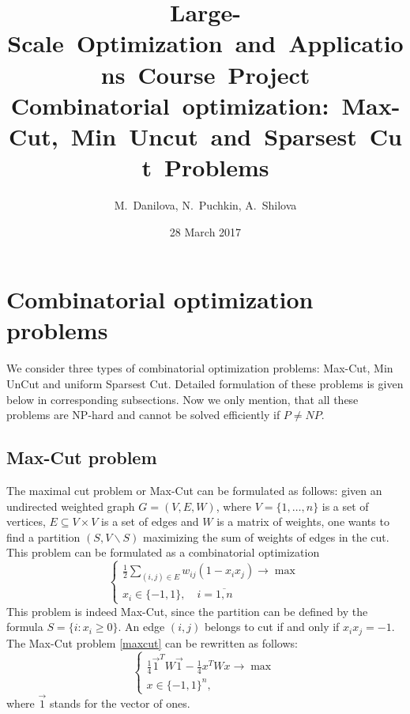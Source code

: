 \documentclass[12pt]{article}
\title{Large-Scale~Optimization~and~Applications~Course~Project\\
Combinatorial~optimization:~Max-Cut,~Min~Uncut~and~Sparsest~Cut~Problems}
\author{M.~Danilova, N.~Puchkin, A.~Shilova}
\date{28 March 2017}
\begin{document}
\maketitle

\section{Combinatorial optimization problems}

We consider three types of combinatorial optimization problems: Max-Cut, Min UnCut 
and uniform Sparsest Cut.
Detailed formulation of these problems is given below in corresponding subsections.
Now we only mention, that all these problems are NP-hard and cannot be solved 
efficiently if $P \neq NP$.



\subsection{Max-Cut problem}

The maximal cut problem or Max-Cut can be formulated as follows: given an undirected 
weighted graph $G = (V, E, W)$, where $V = \{1, \dots, n\}$ is a set of vertices, $E 
\subseteq V \times V$ is a set of edges and $W$ is a matrix of weights, one wants to find 
a partition $(S, V\backslash S)$ maximizing the sum of weights of edges in the cut.
This problem can be formulated as a combinatorial optimization
\begin{equation}
\label{maxcut}
	\begin{cases}
		\frac12 \sum\limits_{(i, j) \in E} w_{ij} ( 1 - x_i x_j ) \longrightarrow \max \\
		x_i \in \{ -1, 1 \}, \quad i = \overline{1, n}
	\end{cases}
\end{equation}
This problem is indeed Max-Cut, since the partition can be defined by the formula $S = 
\{ i : x_i \geq 0 \}$.
An edge $(i, j)$ belongs to cut if and only if $x_i x_j = -1$.
The Max-Cut problem \ref{maxcut} can be rewritten as follows:
\begin{equation}
\label{maxcut1}
	\begin{cases}
		\frac14 \vec 1^T W \vec 1 - \frac14 x^T W x \longrightarrow \max \\
		x \in \{-1, 1\}^n,
	\end{cases}
\end{equation}
where $\vec 1$ stands for the vector of ones.
\end{document}
